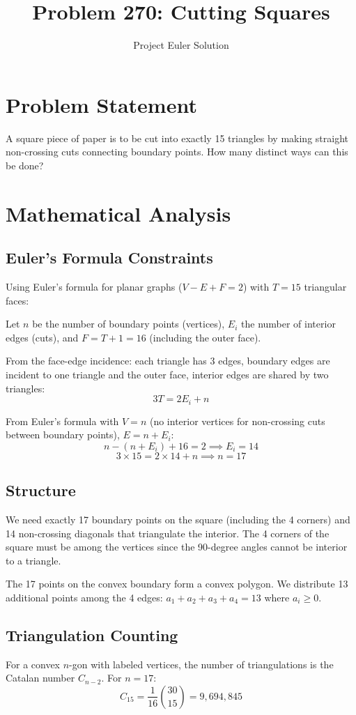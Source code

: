 \documentclass[12pt]{article}
\title{Problem 270: Cutting Squares}
\author{Project Euler Solution}
\date{}
\begin{document}
\maketitle

\section{Problem Statement}
A square piece of paper is to be cut into exactly 15 triangles by making straight non-crossing cuts connecting boundary points. How many distinct ways can this be done?

\section{Mathematical Analysis}

\subsection{Euler's Formula Constraints}
Using Euler's formula for planar graphs ($V - E + F = 2$) with $T = 15$ triangular faces:

Let $n$ be the number of boundary points (vertices), $E_i$ the number of interior edges (cuts), and $F = T + 1 = 16$ (including the outer face).

From the face-edge incidence: each triangle has 3 edges, boundary edges are incident to one triangle and the outer face, interior edges are shared by two triangles:
\[ 3T = 2E_i + n \]

From Euler's formula with $V = n$ (no interior vertices for non-crossing cuts between boundary points), $E = n + E_i$:
\[ n - (n + E_i) + 16 = 2 \implies E_i = 14 \]
\[ 3 \times 15 = 2 \times 14 + n \implies n = 17 \]

\subsection{Structure}
We need exactly 17 boundary points on the square (including the 4 corners) and 14 non-crossing diagonals that triangulate the interior. The 4 corners of the square must be among the vertices since the 90-degree angles cannot be interior to a triangle.

The 17 points on the convex boundary form a convex polygon. We distribute 13 additional points among the 4 edges: $a_1 + a_2 + a_3 + a_4 = 13$ where $a_i \geq 0$.

\subsection{Triangulation Counting}
For a convex $n$-gon with labeled vertices, the number of triangulations is the Catalan number $C_{n-2}$. For $n = 17$:
\[ C_{15} = \frac{1}{16}\binom{30}{15} = 9{,}694{,}845 \]
\end{document}
